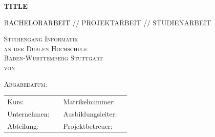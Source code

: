 \documentclass[12pt]{report}
\begin{document}
 
	\begin{titlepage}
		\thispagestyle{titlepage}
		\newcommand\HRule{\rule{\textwidth}{1pt}} %

		
		\begin{center}
			
			\vspace*{2cm}
			
			{ \huge \bfseries TITLE}
			
			\vspace*{1.5cm}
			
			\textsc{\Large BACHELORARBEIT // PROJEKTARBEIT // STUDIENARBEIT}
			
			\vspace*{3cm}
			
			\textsc{\LARGE Studiengang Informatik}\\[0.3cm]
			\textsc{\LARGE an der Dualen Hochschule}\\[0.3cm]
			\textsc{\LARGE Baden-Württemberg Stuttgart}\\[2.5cm]

			
			\textsc{\Large von \meinName}
			
			\vspace*{1.5cm}
			
			\textsc{\Large Abgabedatum: \abgabeDatum}

			\begin{table}[bp]
				\begin{tabular}{l l l l}
					Kurs: & \meinKurs & Matrikelnummer: & \meineMatrikelNr  \\
					Unternehmen: & \firmenName & Ausbildungsleiter: & \ausbildungsLeiter\\
					Abteilung: &  \abteilungsName & Projektbetreuer: &  \projektBetreuer\\
				\end{tabular}
			\end{table}
			
			
		\end{center}
		
	\end{titlepage}



\fancypagestyle{plain}{
	\fancyfoot[L]{\meinName\\
		 - \meinKurs}
	\fancyfoot[C]{Seite \thepage\ }%
	\fancyfoot[R]{\abgabeDatum}
}
\end{document}
